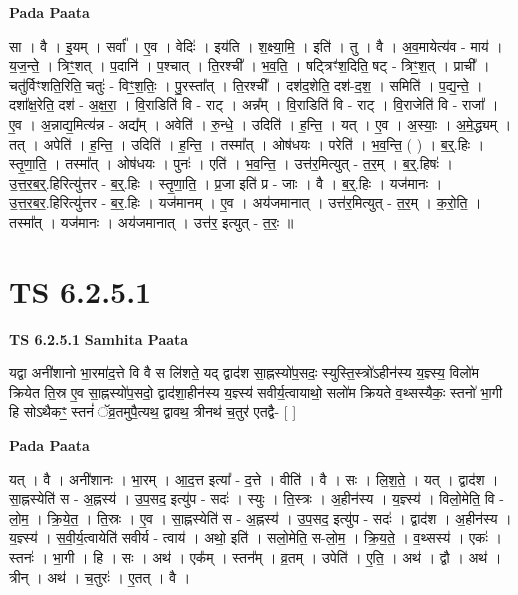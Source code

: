 \documentclass[17pt]{extarticle}
\begin{document}
\textbf{Pada Paata} \newline

सा । वै । इ॒यम् । सर्वा᳚ । ए॒व । वेदिः॑ । इय॑ति । श॒क्ष्या॒मि॒ । इति॑ । तु । वै । अ॒व॒मायेत्य॑व - माय॑ । य॒ज॒न्ते॒ । त्रिꣳ॒॒शत् । प॒दानि॑ । प॒श्चात् । ति॒रश्ची᳚ । भ॒व॒ति॒ । षट्त्रिꣳ॑श॒दिति॒ षट् - त्रिꣳ॒॒श॒त् । प्राची᳚ । चतु॑र्विꣳशति॒रिति॒ चतुः॑ - विꣳ॒॒श॒तिः॒ । पु॒रस्ता᳚त् । ति॒रश्ची᳚ । दश॑द॒शेति॒ दश॑-द॒श॒ । समिति॑ । प॒द्य॒न्ते॒ । दशा᳚क्ष॒रेति॒ दश॑ - अ॒क्ष॒रा॒ । वि॒राडिति॑ वि - राट् । अन्न᳚म् । वि॒राडिति॑ वि - राट् । वि॒राजेति॑ वि - राजा᳚ । ए॒व । अ॒न्नाद्य॒मित्य॑न्न - अद्य᳚म् । अवेति॑ । रु॒न्धे॒ । उदिति॑ । ह॒न्ति॒ । यत् । ए॒व । अ॒स्याः॒ । अ॒मे॒द्ध्यम् । तत् । अपेति॑ । ह॒न्ति॒ । उदिति॑ । ह॒न्ति॒ । तस्मा᳚त् । ओष॑धयः । परेति॑ । भ॒व॒न्ति॒ ( ) । ब॒र्॒.हिः । स्तृ॒णा॒ति॒ । तस्मा᳚त् । ओष॑धयः । पुनः॑ । एति॑ । भ॒व॒न्ति॒ । उत्त॑र॒मित्युत् - त॒र॒म् । ब॒र्॒.हिषः॑ । उ॒त्त॒र॒ब॒र्॒.हिरित्यु॑त्तर - ब॒र्॒.हिः । स्तृ॒णा॒ति॒ । प्र॒जा इति॑ प्र - जाः । वै । ब॒र्॒.हिः । यज॑मानः । उ॒त्त॒र॒ब॒र॒.हिरित्यु॑त्तर - ब॒र॒.हिः । यज॑मानम् । ए॒व । अय॑जमानात् । उत्त॑र॒मित्युत् - त॒र॒म् । क॒रो॒ति॒ । तस्मा᳚त् । यज॑मानः । अय॑जमानात् । उत्त॑र॒ इत्युत् - त॒रः॒ ॥  \newline




\section*{ TS 6.2.5.1 }

\textbf{TS 6.2.5.1 } \newline
\textbf{Samhita Paata} \newline

यद्वा अनी॑शानो भा॒रमा॑द॒त्ते वि वै स लि॑शते॒ यद् द्वाद॑श सा॒ह्नस्यो॑प॒सदः॒ स्युस्ति॒स्त्रो॑ऽहीन॑स्य य॒ज्ञ्स्य॒ विलो॑म क्रियेत ति॒स्र ए॒व सा॒ह्नस्यो॑प॒सदो॒ द्वाद॑शा॒हीन॑स्य य॒ज्ञ्स्य॑ सवीर्य॒त्वायाथो॒ सलो॑म क्रियते व॒थ्सस्यैकः॒ स्तनो॑ भा॒गी हि सोऽथैकꣳ॒॒ स्तनं॑ ॅव्र॒तमुपै॒त्यथ॒ द्वावथ॒ त्रीनथ॑ च॒तुर॑ एतद्वै- [  ] \newline

\textbf{Pada Paata} \newline

यत् । वै । अनी॑शानः । भा॒रम् । आ॒द॒त्त इत्या᳚ - द॒त्ते । वीति॑ । वै । सः । लि॒श॒ते॒ । यत् । द्वाद॑श । सा॒ह्नस्येति॑ स - अ॒ह्नस्य॑ । उ॒प॒सद॒ इत्यु॑प - सदः॑ । स्युः । ति॒स्त्रः । अ॒हीन॑स्य । य॒ज्ञ्स्य॑ । विलो॒मेति॒ वि - लो॒म॒ । क्रि॒ये॒त॒ । ति॒स्रः । ए॒व । सा॒ह्नस्येति॑ स - अ॒ह्नस्य॑ । उ॒प॒सद॒ इत्यु॑प - सदः॑ । द्वाद॑श । अ॒हीन॑स्य । य॒ज्ञ्स्य॑ । स॒वी॒र्य॒त्वायेति॑ सवीर्य - त्वाय॑ । अथो॒ इति॑ । सलो॒मेति॒ स-लो॒म॒ । क्रि॒य॒ते॒ । व॒थ्सस्य॑ । एकः॑ । स्तनः॑ । भा॒गी । हि । सः । अथ॑ । एक᳚म् । स्तन᳚म् । व्र॒तम् । उपेति॑ । ए॒ति॒ । अथ॑ । द्वौ । अथ॑ । त्रीन् । अथ॑ । च॒तुरः॑ । ए॒तत् । वै ।  \newline
\end{document}
